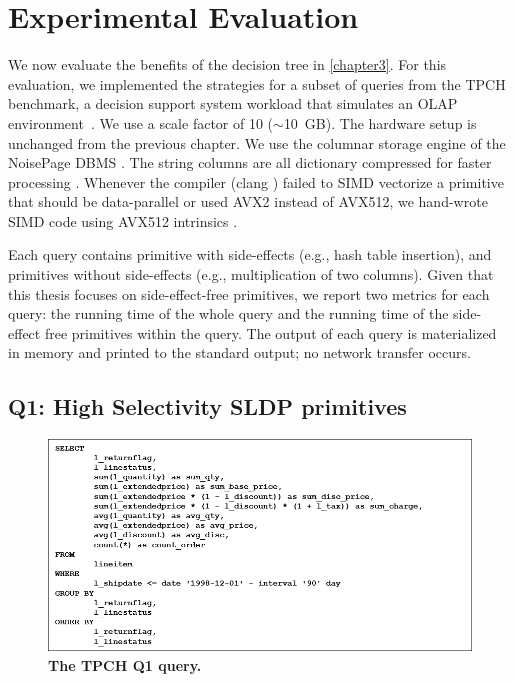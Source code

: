 \documentclass[12pt]{cmuthesis}
\begin{document}
\chapter{Experimental Evaluation}
\label{chapter4}

We now evaluate the benefits of the decision tree in \cref{chapter3}. For this evaluation, we implemented the strategies for a subset of queries from the TPCH benchmark, a decision support system workload that simulates an OLAP environment~\cite{tpch}. We use a scale factor of 10 ($\sim$10~GB). The hardware setup is unchanged from the previous chapter. We use the columnar storage engine of the NoisePage DBMS \cite{noise_page}. The string columns are all dictionary compressed for faster processing \cite{abadicompression}. Whenever the compiler (clang \cite{clang}) failed to SIMD vectorize a primitive that should be data-parallel or used AVX2 instead of AVX512, we hand-wrote SIMD code using AVX512 intrinsics \cite{intel2019}.

Each query contains primitive with side-effects (e.g., hash table insertion), and primitives without side-effects (e.g., multiplication of two columns). Given that this thesis focuses on side-effect-free primitives, we report two metrics for each query: the running time of the whole query and the running time of the side-effect free primitives within the query. The output of each query is materialized in memory and printed to the standard output; no network transfer occurs.

\section{Q1: High Selectivity SLDP primitives}
\begin{figure}[t!]
    \centering
    \includegraphics[scale=0.5]{images/TPCH-Q1.png}
    \caption{\textbf{The TPCH Q1 query.}}
    \label{fig:tpch_q1}
\end{figure}
\end{document}
